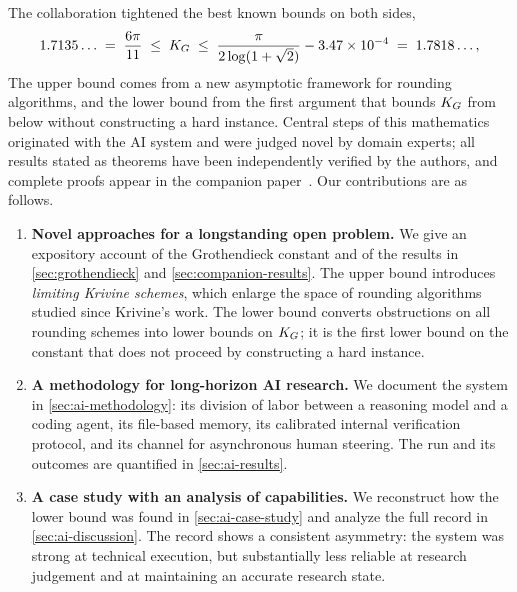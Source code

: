 The collaboration tightened the best known bounds on both sides,
\[
    1.7135\ldots
    \;=\;
    \frac{6\pi}{11}
    \;\le\;
    K_G
    \;\le\;
    \frac{\pi}{2\log(1+\sqrt2)} - 3.47\times10^{-4}
    \;=\;
    1.7818\ldots,
\]
The upper bound comes from a new asymptotic framework for rounding algorithms, and the lower bound from the first argument that bounds $K_G$ from below without constructing a hard instance.
Central steps of this mathematics originated with the AI system and were judged novel by domain experts; all results stated as theorems have been independently verified by the authors, and complete proofs appear in the companion paper~\cite{saha2026new}.
Our contributions are as follows.
\begin{enumerate}[label=(\arabic*), leftmargin=*]
    \item \textbf{Novel approaches for a longstanding open problem.}
    We give an expository account of the Grothendieck constant and of the results in \cref{sec:grothendieck} and \cref{sec:companion-results}.
    The upper bound introduces \emph{limiting Krivine schemes}, which enlarge the space of rounding algorithms studied since Krivine's work.
    The lower bound converts obstructions on all rounding schemes into lower bounds on $K_G$; it is the first lower bound on the constant that does not proceed by constructing a hard instance.

    \item \textbf{A methodology for long-horizon AI research.}
    We document the system in \cref{sec:ai-methodology}: its division of labor between a reasoning model and a coding agent, its file-based memory, its calibrated internal verification protocol, and its channel for asynchronous human steering.
    The run and its outcomes are quantified in \cref{sec:ai-results}.

    \item \textbf{A case study with an analysis of capabilities.}
    We reconstruct how the lower bound was found in \cref{sec:ai-case-study} and analyze the full record in \cref{sec:ai-discussion}.
    The record shows a consistent asymmetry: the system was strong at technical execution, but substantially less reliable at research judgement and at maintaining an accurate research state.
\end{enumerate}
